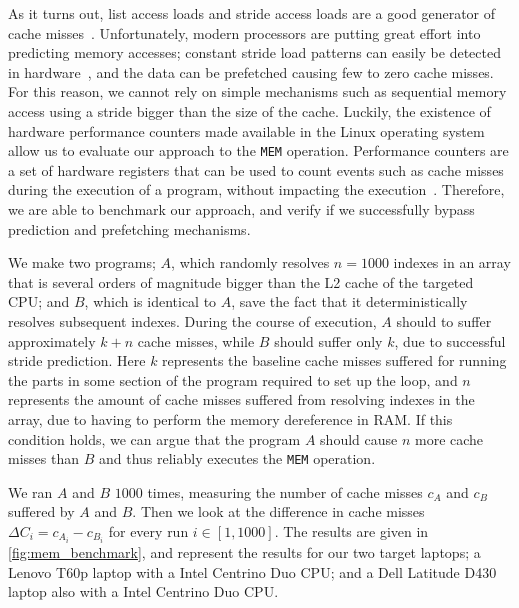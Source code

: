 As it turns out, list access loads and stride access loads are a good generator of cache misses~\cite{DBLP:conf/micro/OzawaKN95}.
Unfortunately, modern processors are putting great effort into predicting memory accesses; constant stride load patterns can easily be detected in hardware~\cite{DBLP:journals/taco/LeeKV12}, and the data can be prefetched causing few to zero cache misses.
For this reason, we cannot rely on simple mechanisms such as sequential memory access using a stride bigger than the size of the cache.
Luckily, the existence of hardware performance counters made available in the Linux operating system allow us to evaluate our approach to the \texttt{MEM} operation. 
Performance counters are a set of hardware registers that can be used to count events such as cache misses during the execution of a program, without impacting the execution~\cite{url:perf_wiki}.
Therefore, we are able to benchmark our approach, and verify if we successfully bypass prediction and prefetching mechanisms.

We make two programs; \(A\), which randomly resolves \(n = 1000\) indexes in an array that is several orders of magnitude bigger than the L2 cache of the targeted \gls{CPU}; and \(B\), which is identical to \(A\), save the fact that it deterministically resolves subsequent indexes.
During the course of execution, \(A\) should to suffer approximately \(k+n\) cache misses, while \(B\) should suffer only \(k\), due to successful stride prediction.
Here \(k\) represents the baseline cache misses suffered for running the parts in some section of the program required to set up the loop, and \(n\) represents the amount of cache misses suffered from resolving indexes in the array, due to having to perform the memory dereference in RAM.
If this condition holds, we can argue that the program \(A\) should cause \(n\) more cache misses than \(B\) and thus reliably executes the \texttt{MEM} operation. 

We ran \(A\) and \(B\) \(1000\) times, measuring the number of cache misses \(c_A\) and \(c_B\) suffered by \(A\) and \(B\).
Then we look at the difference in cache misses \(\Delta C_i = c_{A_i} - c_{B_i}\) for every run \(i \in [1, 1000]\).
The results are given in \autoref{fig:mem_benchmark}, and represent the results for our two target laptops; a Lenovo T60p laptop with a Intel Centrino Duo \gls{CPU}; and a Dell Latitude D430 laptop also with a Intel Centrino Duo \gls{CPU}.

